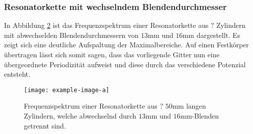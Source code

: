 \begin{figure}[H]
    \centering
    \hfil
    \hfil 
    \caption{}
    \label{fig:abwech_zylin}
\end{figure}

\subsubsection*{Resonatorkette mit wechselndem Blendendurchmesser}
In Abbildung \ref{fig:abwech_blende} ist das Frequenzspektrum einer Resonatorkette aus $?$ Zylindern mit abwechselden Blendendurchmessern
von $13$mm und $16$mm dargestellt. Es zeigt sich eine deutliche Aufspaltung der Maximalbereiche.
Auf einen Festkörper übertragen lässt sich somit sagen, dass das vorliegende Gitter nun eine übergeordnete Periodizität aufweist und diese durch
das verschiedene Potenzial entsteht.

\begin{figure}
    \center
    \texttt{[image: example-image-a]}
    \caption{Frequenzspektrum einer Resonatorkette aus $?$ $50$mm langen Zylindern, welche abwechselnd durch $13$mm und $16$mm-Blenden getrennt sind.}
    \label{fig:abwech_blende}
\end{figure}
